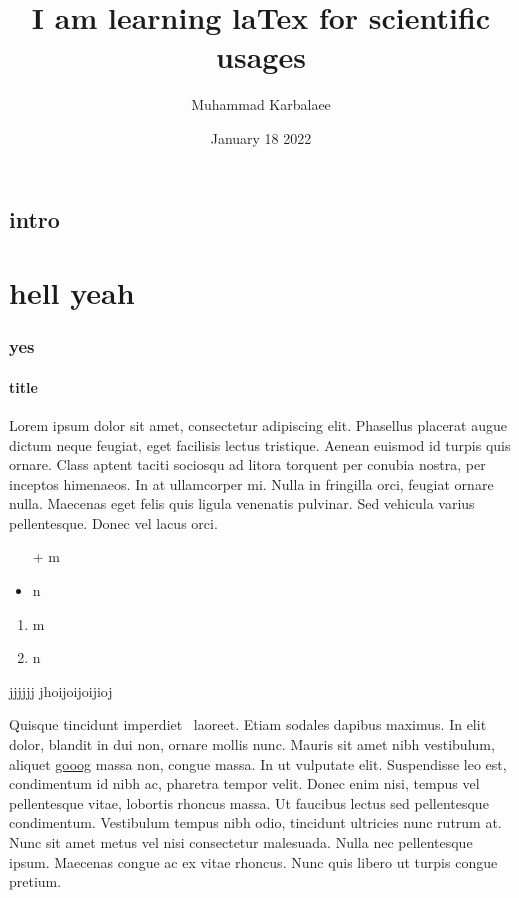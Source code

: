 \documentclass[letterpaper,12pt]{book}
\author{Muhammad Karbalaee}
\title{I am learning laTex for scientific usages}
\date{January 18 2022}
\begin{document}
	\maketitle
	\tableofcontents
	\section{intro}
	\chapter{hell yeah}
	\subsection{yes}
	\subsubsection{title}

	 Lorem ipsum dolor sit amet, consectetur adipiscing elit. Phasellus placerat augue dictum neque feugiat, eget facilisis lectus tristique. Aenean euismod id turpis quis ornare. Class aptent taciti sociosqu ad litora torquent per conubia nostra, per inceptos himenaeos. In at ullamcorper mi. Nulla in fringilla orci, feugiat ornare nulla. Maecenas eget felis quis ligula venenatis pulvinar. Sed vehicula varius pellentesque. Donec vel lacus orci.
	
	\begin{itemize}
		\item[+] m
		\item n
	\end{itemize}

	\begin{enumerate}
		\item m
		\item n
	\end{enumerate}

	\begin{description}
		\item jjjjjj jhoijoijoijioj
	\end{description}
	Quisque tincidunt imperdiet \ laoreet. Etiam sodales dapibus maximus. In elit dolor, blandit in dui non, ornare mollis nunc. Mauris sit amet nibh vestibulum, aliquet
	\href{www.google.com}{gooog} 
	massa non, congue massa. In ut vulputate elit. Suspendisse leo est, condimentum id nibh ac, pharetra tempor velit. Donec enim nisi, tempus vel pellentesque vitae, lobortis rhoncus massa. Ut faucibus lectus sed pellentesque condimentum. Vestibulum tempus nibh odio, tincidunt ultricies nunc rutrum at. Nunc sit amet metus vel nisi consectetur malesuada. Nulla nec pellentesque ipsum. Maecenas congue ac ex vitae rhoncus. Nunc quis libero ut turpis congue \\ pretium. \newpage
	
\end{document}
